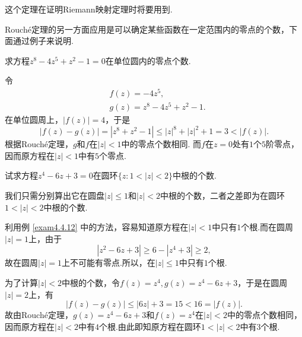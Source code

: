 这个定理在证明Riemann映射定理时将要用到.

Rouch\'e定理的另一方面应用是可以确定某些函数在一定范围内的零点的个数，下面通过例子来说明.
\begin{example}\label{exam4.4.12}
  求方程$z^8-4z^5+z^2-1=0$在单位圆内的零点个数.
\end{example}
\begin{solution}
  令
  \begin{align*}
    & f(z) = -4z^5,\\
    & g(z) = z^8 - 4z^5 + z^2 - 1.
  \end{align*}
  在单位圆周上，$|f(z)|=4$，于是
  \[
    |f(z)-g(z)| = |z^8+z^2-1| \le |z|^8+|z|^2+1 = 3 < |f(z)|.
  \]
  根据Rouch\'e定理，$g$和$f$在$|z|<1$中的零点个数相同. 而$f$在$z=0$处有$1$个$5$阶零点，因而原方程在$|z|<1$中有$5$个零点.
\end{solution}


\begin{example}\label{exam4.4.13}
  试求方程$z^4-6z+3=0$在圆环$\{z:1<|z|<2\}$中根的个数.
\end{example}
\begin{solution}
  我们只需分别算出它在圆盘$|z|\le1$和$|z|<2$中根的个数，二者之差即为在圆环$1<|z|<2$中根的个数.

  利用例 \ref{exam4.4.12} 中的方法，容易知道原方程在$|z|<1$中只有$1$个根.而在圆周$|z|=1$上，由于
  \[
    |z^2 - 6z + 3|\ge 6 - |z^4 + 3| \ge 2,
  \]
  故在圆周$|z|=1$上不可能有零点.所以，在$|z|\le1$中只有$1$个根.

  为了计算$|z|<2$中根的个数，令$f(z)=z^4,g(z)=z^4-6z+3$，于是在圆周$|z|=2$上，有
  \[
    |f(z) - g(z)| \le| 6z | + 3 = 15 < 16 = |f(z)|.
  \]
  故由Rouch\'e定理，$g(z)=z^4-6z+3$和$f(z)=z^4$在$|z|<2$中的零点个数相同，因而原方程在$|z|<2$中有$4$个根.由此即知原方程在圆环$1<|z|<2$中有$3$个根.
\end{solution}

